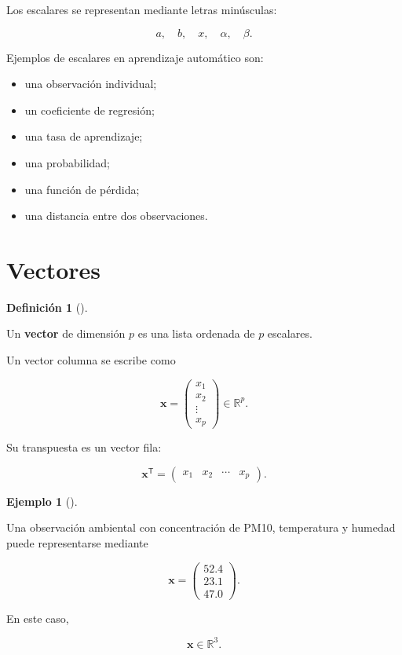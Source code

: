 \documentclass[
  spanish,
  11pt,
  letterpaper,
  DIV=11,
  numbers=noendperiod]{scrreprt}
\providecommand{\tightlist}{%
  \setlength{\itemsep}{0pt}\setlength{\parskip}{0pt}}
\theoremstyle{definition}
\newtheorem{definition}{Definición}[chapter]
\theoremstyle{plain}
\theoremstyle{definition}
\newtheorem{example}{Ejemplo}[chapter]
\theoremstyle{remark}
\begin{document}
Los escalares se representan mediante letras minúsculas:

\[
a,\quad b,\quad x,\quad \alpha,\quad \beta.
\]

Ejemplos de escalares en aprendizaje automático son:

\begin{itemize}
\tightlist
\item
  una observación individual;
\item
  un coeficiente de regresión;
\item
  una tasa de aprendizaje;
\item
  una probabilidad;
\item
  una función de pérdida;
\item
  una distancia entre dos observaciones.
\end{itemize}

\section{Vectores}\label{vectores}

\begin{definition}[]\protect\hypertarget{def-vector}{}\label{def-vector}

Un \textbf{vector} de dimensión \(p\) es una lista ordenada de \(p\)
escalares.

\end{definition}

Un vector columna se escribe como

\[
\mathbf{x}
=
\begin{pmatrix}
x_1\\
x_2\\
\vdots\\
x_p
\end{pmatrix}
\in\mathbb{R}^{p}.
\]

Su transpuesta es un vector fila:

\[
\mathbf{x}^{\mathsf T}
=
\begin{pmatrix}
x_1 & x_2 & \cdots & x_p
\end{pmatrix}.
\]

\begin{example}[]\protect\hypertarget{exm-vector-observacion}{}\label{exm-vector-observacion}

Una observación ambiental con concentración de PM10, temperatura y
humedad puede representarse mediante

\[
\mathbf{x}
=
\begin{pmatrix}
52.4\\
23.1\\
47.0
\end{pmatrix}.
\]

En este caso,

\[
\mathbf{x}\in\mathbb{R}^{3}.
\]

\end{example}
\end{document}
